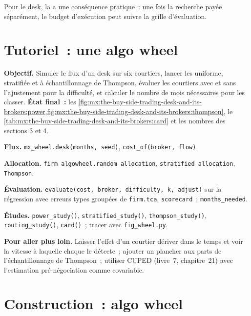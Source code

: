 Pour le desk, la  a une conséquence pratique~: une fois la recherche payée séparément, le budget d'exécution peut suivre la grille d'évaluation.

\section{Tutoriel~: une algo wheel}\label{tut:mx:the-buy-side-trading-desk-and-its-brokers:tut}

\begin{tutorial}
\textbf{Objectif.} Simuler le flux d'un desk sur six courtiers, lancer les  uniforme, stratifiée et à échantillonnage de Thompson, évaluer les courtiers avec et sans
l'ajustement pour la difficulté, et calculer le nombre de mois nécessaires pour les classer.
\textbf{État final~:} les \cref{fig:mx:the-buy-side-trading-desk-and-its-brokers:power,fig:mx:the-buy-side-trading-desk-and-its-brokers:thompson},
le \cref{tab:mx:the-buy-side-trading-desk-and-its-brokers:card} et les nombres des sections 3 et 4.
\begin{tutsteps}
\item \textbf{Flux.} \texttt{mx\_wheel.desk(months, seed)}, \texttt{cost\_of(broker, flow)}.
\item \textbf{Allocation.} \texttt{firm\_algowheel.random\_allocation}, \texttt{stratified\_allocation}, \texttt{Thompson}.
\item \textbf{Évaluation.} \texttt{evaluate(cost, broker, difficulty, k, adjust)} sur la régression avec erreurs types groupées de \texttt{firm.tca}, \texttt{scorecard}~;
\texttt{months\_needed}.
\item \textbf{Études.} \texttt{power\_study()}, \texttt{stratified\_study()}, \texttt{thompson\_study()}, \texttt{routing\_study()}, \texttt{card()}~;
tracer avec \texttt{fig\_wheel.py}.
\end{tutsteps}
\textbf{Pour aller plus loin.} Laisser l'effet d'un courtier dériver dans le temps et voir la vitesse à laquelle chaque  le détecte~; ajouter un plancher aux parts de l'échantillonnage de Thompson~;
utiliser CUPED (livre~7, chapitre~21) avec l'estimation pré-négociation comme covariable.
\end{tutorial}

\section{Construction~: algo wheel}\label{bld:mx:the-buy-side-trading-desk-and-its-brokers:algowheel}

